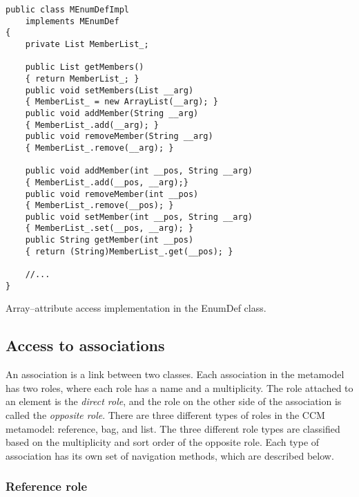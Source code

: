 \begin{Example}
\begin{minifbox}
\begin{small}
\begin{verbatim}
public class MEnumDefImpl
    implements MEnumDef
{
    private List MemberList_;

    public List getMembers()
    { return MemberList_; }
    public void setMembers(List __arg)
    { MemberList_ = new ArrayList(__arg); }
    public void addMember(String __arg)
    { MemberList_.add(__arg); }
    public void removeMember(String __arg)
    { MemberList_.remove(__arg); }

    public void addMember(int __pos, String __arg)
    { MemberList_.add(__pos, __arg);}
    public void removeMember(int __pos)
    { MemberList_.remove(__pos); }
    public void setMember(int __pos, String __arg)
    { MemberList_.set(__pos, __arg); }
    public String getMember(int __pos)
    { return (String)MemberList_.get(__pos); }

    //...
}
\end{verbatim}
\end{small}
\end{minifbox}
\caption{Array--attribute access implementation in the EnumDef class.}
\label{example:metamodel-array-attribute-impl}
\end{Example}

\subsection{Access to associations}

An association is a link between two classes. Each association in the metamodel
has two roles, where each role has a name and a multiplicity. The role attached
to an element is the {\em direct role}, and the role on the other side of the
association is called the {\em opposite role}. There are three different types
of roles in the CCM metamodel: reference, bag, and list. The three different
role types are classified based on the multiplicity and sort order of the
opposite role. Each type of association has its own set of navigation methods,
which are described below.

\subsubsection{Reference role}

